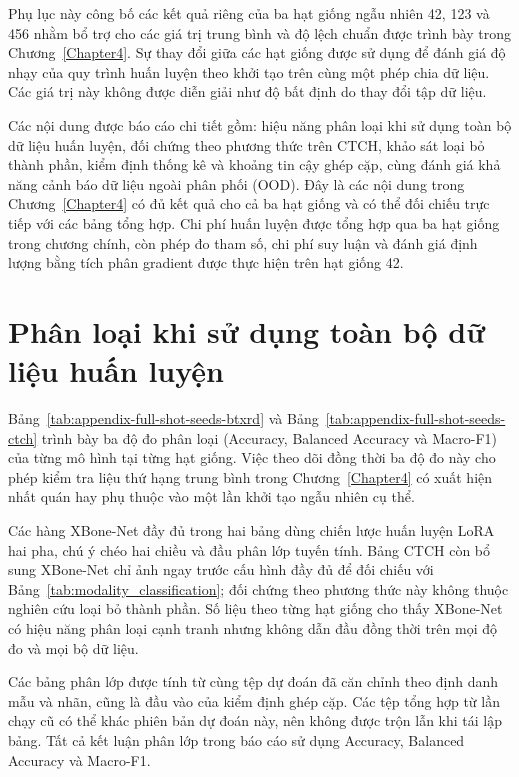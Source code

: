 Phụ lục này công bố các kết quả riêng của ba hạt giống ngẫu nhiên 42, 123 và 456 nhằm bổ trợ cho các giá trị trung bình và độ lệch chuẩn được trình bày trong Chương~\ref{Chapter4}. Sự thay đổi giữa các hạt giống được sử dụng để đánh giá độ nhạy của quy trình huấn luyện theo khởi tạo trên cùng một phép chia dữ liệu. Các giá trị này không được diễn giải như độ bất định do thay đổi tập dữ liệu.

Các nội dung được báo cáo chi tiết gồm: hiệu năng phân loại khi sử dụng toàn bộ dữ liệu huấn luyện, đối chứng theo phương thức trên CTCH, khảo sát loại bỏ thành phần, kiểm định thống kê và khoảng tin cậy ghép cặp, cùng đánh giá khả năng cảnh báo dữ liệu ngoài phân phối (OOD). Đây là các nội dung trong Chương~\ref{Chapter4} có đủ kết quả cho cả ba hạt giống và có thể đối chiếu trực tiếp với các bảng tổng hợp. Chi phí huấn luyện được tổng hợp qua ba hạt giống trong chương chính, còn phép đo tham số, chi phí suy luận và đánh giá định lượng bằng tích phân gradient được thực hiện trên hạt giống 42.

\section{Phân loại khi sử dụng toàn bộ dữ liệu huấn luyện}

Bảng~\ref{tab:appendix-full-shot-seeds-btxrd} và Bảng~\ref{tab:appendix-full-shot-seeds-ctch} trình bày ba độ đo phân loại (Accuracy, Balanced Accuracy và Macro-F1) của từng mô hình tại từng hạt giống. Việc theo dõi đồng thời ba độ đo này cho phép kiểm tra liệu thứ hạng trung bình trong Chương~\ref{Chapter4} có xuất hiện nhất quán hay phụ thuộc vào một lần khởi tạo ngẫu nhiên cụ thể.



Các hàng XBone-Net đầy đủ trong hai bảng dùng chiến lược huấn luyện LoRA hai pha, chú ý chéo hai chiều và đầu phân lớp tuyến tính. Bảng CTCH còn bổ sung XBone-Net chỉ ảnh ngay trước cấu hình đầy đủ để đối chiếu với Bảng~\ref{tab:modality_classification}; đối chứng theo phương thức này không thuộc nghiên cứu loại bỏ thành phần. Số liệu theo từng hạt giống cho thấy XBone-Net có hiệu năng phân loại cạnh tranh nhưng không dẫn đầu đồng thời trên mọi độ đo và mọi bộ dữ liệu.

Các bảng phân lớp được tính từ cùng tệp dự đoán đã căn chỉnh theo định danh mẫu và nhãn, cũng là đầu vào của kiểm định ghép cặp. Các tệp tổng hợp từ lần chạy cũ có thể khác phiên bản dự đoán này, nên không được trộn lẫn khi tái lập bảng. Tất cả kết luận phân lớp trong báo cáo sử dụng Accuracy, Balanced Accuracy và Macro-F1.

